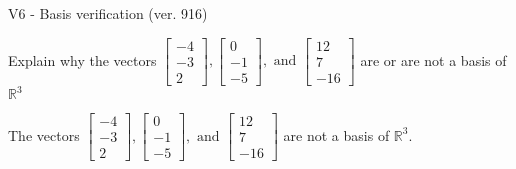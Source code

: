 \begin{exercise}
  \begin{exerciseTitle}V6 - Basis verification (ver. 916)\end{exerciseTitle}
  \begin{exerciseStatement}
    Explain why the vectors \(\left[\begin{array}{r}
-4 \\
-3 \\
2
\end{array}\right] , \left[\begin{array}{r}
0 \\
-1 \\
-5
\end{array}\right] , \text{ and } \left[\begin{array}{r}
12 \\
7 \\
-16
\end{array}\right]\) are or are not a basis of \(\mathbb{R}^3\)	


  \end{exerciseStatement}
  \begin{exerciseAnswer}
   The vectors \(\left[\begin{array}{r}
-4 \\
-3 \\
2
\end{array}\right] , \left[\begin{array}{r}
0 \\
-1 \\
-5
\end{array}\right] , \text{ and } \left[\begin{array}{r}
12 \\
7 \\
-16
\end{array}\right]\) 
  	 are not  a basis of \(\mathbb{R}^3\).
  


  \end{exerciseAnswer}
\end{exercise}